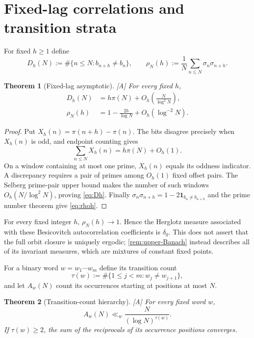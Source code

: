 \documentclass[11pt]{article}
\newtheorem{theorem}{Theorem}[section]
\theoremstyle{definition}
\theoremstyle{remark}
\newcommand{\one}{\mathbf 1}
\newcommand{\status}[1]{\textnormal{\textcolor{accent}{\footnotesize[#1]}}}
\begin{document}
\section{Fixed-lag correlations and transition strata}

For fixed $h\ge1$ define
\[
 D_h(N):=\#\{n\le N:b_{n+h}\ne b_n\},
 \qquad
 \rho_N(h):=\frac1N\sum_{n\le N}\sigma_n\sigma_{n+h}.
\]

\begin{theorem}[Fixed-lag asymptotic]\label{thm:fixed-lag}
\status{A}
For every fixed $h$,
\begin{align}
 D_h(N)&=h\pi(N)+O_h\!\left(\frac{N}{\log^2N}\right),\label{eq:Dh}\\
 \rho_N(h)&=1-\frac{2h}{\log N}+O_h(\log^{-2}N).\label{eq:rhoh}
\end{align}
\end{theorem}

\begin{proof}
Put $X_h(n)=\pi(n+h)-\pi(n)$.  The bits disagree precisely when $X_h(n)$ is odd, and
endpoint counting gives
\[
 \sum_{n\le N}X_h(n)=h\pi(N)+O_h(1).
\]
On a window containing at most one prime, $X_h(n)$ equals its oddness indicator.  A
discrepancy requires a pair of primes among $O_h(1)$ fixed offset pairs.  The Selberg
prime-pair upper bound makes the number of such windows
$O_h(N/\log^2N)$, proving \eqref{eq:Dh}.  Finally
$\sigma_n\sigma_{n+h}=1-2\one_{b_n\ne b_{n+h}}$ and the prime number theorem give
\eqref{eq:rhoh}.
\end{proof}

For every fixed integer $h$, $\rho_N(h)\to1$.  Hence the Herglotz measure associated
with these Besicovitch autocorrelation coefficients is $\delta_0$.  This does not assert
that the full orbit closure is uniquely ergodic; \cref{rem:upper-Banach} instead describes
all of its invariant measures, which are mixtures of constant fixed points.

For a binary word $w=w_1\cdots w_m$ define its transition count
\[
 \tau(w):=\#\{1\le j<m:w_j\ne w_{j+1}\},
\]
and let $A_w(N)$ count its occurrences starting at positions at most $N$.

\begin{theorem}[Transition-count hierarchy]\label{thm:transition-hierarchy}
\status{A}
For every fixed word $w$,
\begin{equation}\label{eq:transition-hierarchy}
 A_w(N)\ll_w\frac{N}{(\log N)^{\tau(w)}}.
\end{equation}
If $\tau(w)\ge2$, the sum of the reciprocals of its occurrence positions converges.
\end{theorem}
\end{document}
